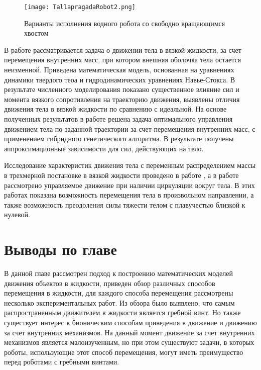 \begin{figure}[h]
	\centering
	\texttt{[image: TallapragadaRobot2.png]}%
	\caption{Варианты исполнения водного робота со свободно вращающимся хвостом}
	\label{TallapragadaRobot2}
\end{figure}



В работе \cite{Ramodanov_Tenenev} рассматривается задача о движении тела в вязкой жидкости, за счет перемещения внутренних масс, при котором внешняя оболочка тела остается неизменной. Приведена математическая модель, основанная на уравнениях динамики твердого теоа и гидродинамических уравнениях Навье-Стокса. В результате численного моделирования показано существенное влияние сил и момента вязкого сопротивления на траекторию движения, выявлены отличия движения тела в вязкой жидкости по сравнению с идеальной. На основе полученных результатов в работе \cite{Vetchanin_Tenenev_2011} решена задача оптимального управления движением тела по заданной траектории за счет перемещения внутренних масс, с применением гибридного генетического алгоритма. В результате получены аппроксимационные зависимости для сил, действующих на тело.

Исследование характеристик движения тела с переменным распределением массы в трехмерной постановке в вязкой жидкости проведено в работе \cite{Vetchanin_Mamaev_Tenenev_ND_2012}, а в работе \cite{Vetchanin_Kilin_2017} рассмотрено управляемое движение при наличии циркуляции вокруг тела. В этих работах показана возможность перемещения тела в произвольном направлении, а также возможность преодоления силы тяжести телом с плавучестью близкой к нулевой.

\section{Выводы по главе}

В данной главе рассмотрен подход к построению математических моделей движения объектов в жидкости, приведен обзор различных способов перемещения в жидкости, для каждого способа перемещения рассмотрены несколько экспериментальных работ. Из обзора было выявлено, что самым распространенным движителем в жидкости является гребной винт. Но также существует интерес к бионическим способам приведения в движение и движению за счет внутренних механизмов. На данный момент движение за счет внутренних механизмов является малоизученным, но при этом существуют задачи, в которых роботы, использующие этот способ перемещения, могут иметь преимущество перед роботами с гребными винтами.

